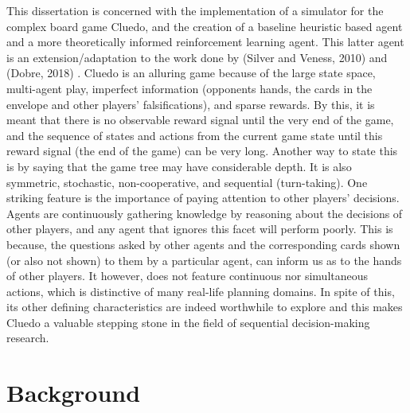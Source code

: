 \documentclass[msc, deptreport, ai, romanprepages]{infthesis}
\begin{document}
This dissertation is concerned with the implementation of a simulator for the complex board game Cluedo, and the creation of a baseline heuristic based agent and a more theoretically informed reinforcement learning agent. This latter agent is an extension/adaptation to the work done by (Silver and Veness, 2010) and (Dobre, 2018) \cite{Silver-veness} \cite{Mihai}. Cluedo is an alluring game because of the large state space, multi-agent play, imperfect information (opponents hands, the cards in the envelope and other players’ falsifications), and sparse rewards. By this, it is meant that there is no observable reward signal until the very end of the game, and the sequence of states and actions from the current game state until this reward signal (the end of the game) can be very long. Another way to state this is by saying that the game tree may have considerable depth. It is also symmetric, stochastic, non-cooperative, and sequential (turn-taking). One striking feature is the importance of paying attention to other players’ decisions. Agents are continuously gathering knowledge by reasoning about the decisions of other players, and any agent that ignores this facet will perform poorly. This is because, the questions asked by other agents and the corresponding cards shown (or also not shown) to them by a particular agent, can inform us as to the hands of other players. It however, does not feature continuous nor simultaneous actions, which is distinctive of many real-life planning domains. In spite of this, its other defining characteristics are indeed worthwhile to explore and this makes Cluedo a valuable stepping stone in the field of sequential decision-making research.
\chapter{Background}
\end{document}
